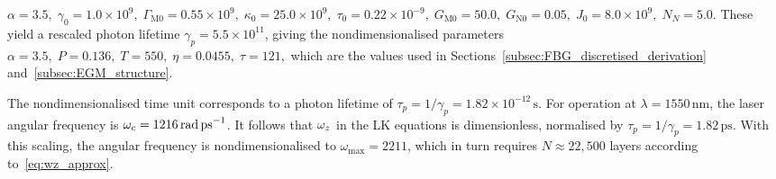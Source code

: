 $
\alpha = 3.5, \; 
\gamma_0 = 1.0 \times 10^9, \; 
\Gamma_{\mathrm{M}0} = 0.55 \times 10^9, \;
\kappa_0 = 25.0 \times 10^9, \; 
\tau_0 = 0.22 \times 10^{-9}, \;
G_{\mathrm{M}0} = 50.0, \; 
G_{\mathrm{N}0} = 0.05, \; 
J_0 = 8.0 \times 10^9, \; 
N_N = 5.0.
$
%
These yield a rescaled photon lifetime \(\gamma_p = 5.5 \times 10^{11}\), giving the nondimensionalised parameters
%
$
\alpha = 3.5, \; 
P = 0.136, \; 
T = 550, \; 
\eta = 0.0455, \; 
\tau = 121,
$
%
which are the values used in Sections~\ref{subsec:FBG_discretised_derivation} and~\ref{subsec:EGM_structure}.  
%
\par
%
The nondimensionalised time unit corresponds to a photon lifetime of \(\tau_p = 1/\gamma_p = 1.82 \times 10^{-12}\,\text{s}\). 
For operation at \(\lambda = 1550\,\text{nm}\), the laser angular frequency is \(\omega_c = 1216\,\text{rad\,ps}^{-1}\). 
It follows that \(\omega_z\) in the LK equations is dimensionless, normalised by \(\tau_p = 1/\gamma_p = 1.82\,\text{ps}\). 
With this scaling, the angular frequency is nondimensionalised to \(\omega_{\max} = 2211\), which in turn requires \(N \approx 22{,}500\) layers according to~\eqref{eq:wz_approx}.
%
%
